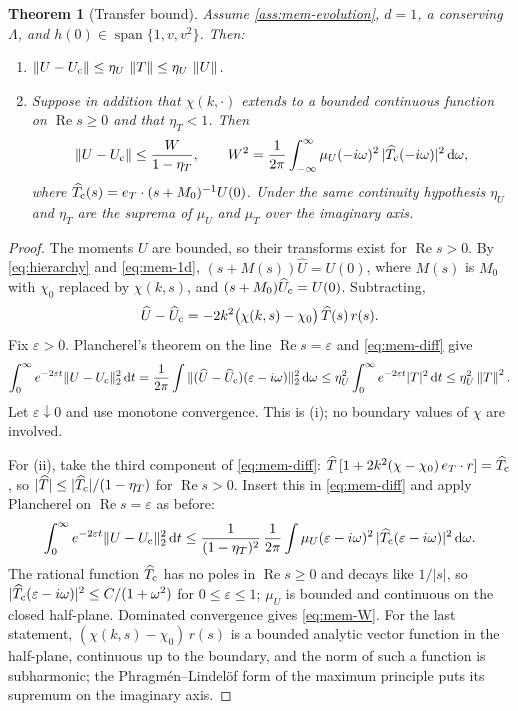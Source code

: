\documentclass[11pt]{article}
\newcommand{\dd}{\,\mathrm d}
\newcommand{\Real}{\operatorname{Re}}
\newcommand{\norm}[1]{\left\|#1\right\|}
\newtheorem{theorem}{Theorem}[section]
\theoremstyle{definition}
\theoremstyle{remark}
\numberwithin{equation}{section}
\begin{document}
\begin{theorem}[Transfer bound]\label{thm:mem-transfer}
Assume \cref{ass:mem-evolution}, $d=1$, a conserving $\Lambda$, and
$h(0)\in\operatorname{span}\{1,v,v^2\}$. Then:
\begin{enumerate}[label=(\roman*)]
\item $\norm{U-U_{\rm c}}\leq\eta_U\,\norm T\leq\eta_U\,\norm U$.
\item Suppose in addition that $\chi(k,\cdot)$ extends to a bounded
continuous function on $\Real s\geq0$ and that $\eta_T<1$. Then
\begin{equation}
 \norm{U-U_{\rm c}}\leq\frac{W}{1-\eta_T},\qquad
 W^2=\frac1{2\pi}\int_{-\infty}^\infty
 \mu_U(-i\omega)^2\,|\widehat T_{\rm c}(-i\omega)|^2\dd\omega ,
 \label{eq:mem-W}
\end{equation}
where $\widehat T_{\rm c}(s)=e_T\cdot(s+M_0)^{-1}U(0)$. Under the same
continuity hypothesis $\eta_U$ and $\eta_T$ are the suprema of
$\mu_U$ and $\mu_T$ over the imaginary axis.
\end{enumerate}
\end{theorem}

\begin{proof}
The moments $U$ are bounded, so their transforms exist for $\Real s>0$.
By \eqref{eq:hierarchy} and \eqref{eq:mem-1d},
$(s+M(s))\widehat U=U(0)$, where $M(s)$ is $M_0$ with $\chi_0$ replaced by
$\chi(k,s)$, and $(s+M_0)\widehat U_{\rm c}=U(0)$. Subtracting,
\begin{equation}
 \widehat U-\widehat U_{\rm c}
 =-2k^2\bigl(\chi(k,s)-\chi_0\bigr)\,\widehat T(s)\,r(s) .
 \label{eq:mem-diff}
\end{equation}
Fix $\varepsilon>0$. Plancherel's theorem on the line
$\Real s=\varepsilon$ and \eqref{eq:mem-diff} give
\[
 \int_0^\infty e^{-2\varepsilon t}\|U-U_{\rm c}\|_2^2\dd t
 =\frac1{2\pi}\int\|(\widehat U-\widehat U_{\rm c})(\varepsilon-i\omega)\|_2^2\dd\omega
 \leq\eta_U^2\int_0^\infty e^{-2\varepsilon t}|T|^2\dd t
 \leq\eta_U^2\norm T^2 .
\]
Let $\varepsilon\downarrow0$ and use monotone convergence. This is (i);
no boundary values of $\chi$ are involved.

For (ii), take the third component of \eqref{eq:mem-diff}:
$\widehat T\,[1+2k^2(\chi-\chi_0)\,e_T\cdot r]=\widehat T_{\rm c}$, so
$|\widehat T|\leq|\widehat T_{\rm c}|/(1-\eta_T)$ for $\Real s>0$.
Insert this in \eqref{eq:mem-diff} and apply Plancherel on
$\Real s=\varepsilon$ as before:
\[
 \int_0^\infty e^{-2\varepsilon t}\|U-U_{\rm c}\|_2^2\dd t
 \leq\frac1{(1-\eta_T)^2}\,\frac1{2\pi}\int
 \mu_U(\varepsilon-i\omega)^2\,|\widehat T_{\rm c}(\varepsilon-i\omega)|^2\dd\omega .
\]
The rational function $\widehat T_{\rm c}$ has no poles in
$\Real s\geq0$ and decays like $1/|s|$, so
$|\widehat T_{\rm c}(\varepsilon-i\omega)|^2\leq C/(1+\omega^2)$ for
$0\leq\varepsilon\leq1$; $\mu_U$ is bounded and continuous on the closed
half-plane. Dominated convergence gives \eqref{eq:mem-W}. For the last
statement, $(\chi(k,s)-\chi_0)\,r(s)$ is a bounded analytic vector function
in the half-plane, continuous up to the boundary, and the norm of such a
function is subharmonic; the Phragm\'en--Lindel\"of form of the maximum
principle puts its supremum on the imaginary axis.
\end{proof}
\end{document}
